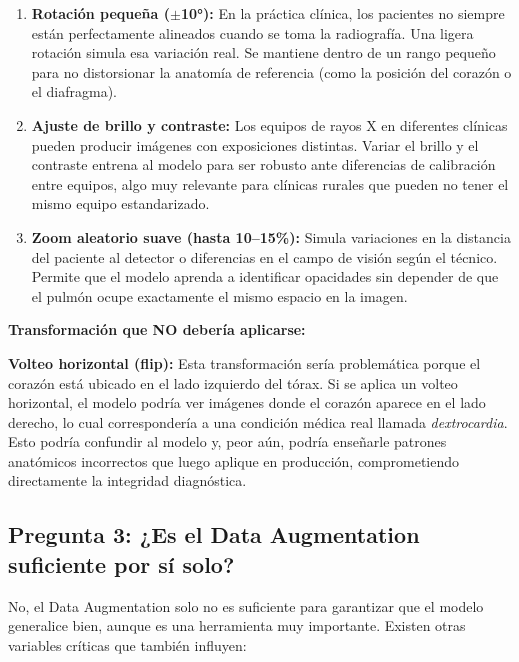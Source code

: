 \documentclass[12pt, letterpaper]{article}
\begin{document}
\begin{enumerate}[leftmargin=1.5cm]
    \item \textbf{Rotación pequeña ($\pm$10°):} En la práctica clínica, los pacientes no siempre
    están perfectamente alineados cuando se toma la radiografía. Una ligera rotación simula esa
    variación real. Se mantiene dentro de un rango pequeño para no distorsionar la anatomía
    de referencia (como la posición del corazón o el diafragma).

    \item \textbf{Ajuste de brillo y contraste:} Los equipos de rayos X en diferentes clínicas
    pueden producir imágenes con exposiciones distintas. Variar el brillo y el contraste entrena
    al modelo para ser robusto ante diferencias de calibración entre equipos, algo muy relevante
    para clínicas rurales que pueden no tener el mismo equipo estandarizado.

    \item \textbf{Zoom aleatorio suave (hasta 10--15\%):} Simula variaciones en la distancia
    del paciente al detector o diferencias en el campo de visión según el técnico. Permite que
    el modelo aprenda a identificar opacidades sin depender de que el pulmón ocupe exactamente
    el mismo espacio en la imagen.
\end{enumerate}

\medskip

\textbf{Transformación que NO debería aplicarse:}

\textbf{Volteo horizontal (flip):} Esta transformación sería problemática porque el corazón
está ubicado en el lado izquierdo del tórax. Si se aplica un volteo horizontal, el modelo podría
ver imágenes donde el corazón aparece en el lado derecho, lo cual correspondería a una condición
médica real llamada \textit{dextrocardia}. Esto podría confundir al modelo y, peor aún, podría
enseñarle patrones anatómicos incorrectos que luego aplique en producción, comprometiendo
directamente la integridad diagnóstica.

\subsection{Pregunta 3: ¿Es el Data Augmentation suficiente por sí solo?}

No, el Data Augmentation solo no es suficiente para garantizar que el modelo generalice bien,
aunque es una herramienta muy importante. Existen otras variables críticas que también influyen:
\end{document}
